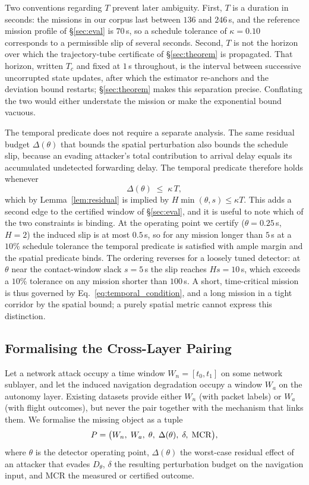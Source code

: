 Two conventions regarding $T$ prevent later ambiguity. First, $T$ is a duration
in seconds: the missions in our corpus last between $136$ and $246$\,s, and the
reference mission profile of \S\ref{sec:eval} is $70$\,s, so a schedule
tolerance of $\kappa=0.10$ corresponds to a permissible slip of several seconds.
Second, $T$ is not the horizon over which the trajectory-tube certificate
of \S\ref{sec:theorem} is propagated. That horizon, written $T_c$ and fixed at
$1$\,s throughout, is the interval between successive uncorrupted state updates,
after which the estimator re-anchors and the deviation bound restarts;
\S\ref{sec:theorem} makes this separation precise. Conflating the two would
either understate the mission or make the exponential bound vacuous.

The temporal predicate does not require a separate analysis. The same residual
budget $\Delta(\theta)$ that bounds the spatial perturbation also bounds the
schedule slip, because an evading attacker's total contribution to arrival delay
equals its accumulated undetected forwarding delay. The temporal predicate
therefore holds whenever
\begin{equation}
\label{eq:temporal_condition}
\Delta(\theta)\;\le\;\kappa\,T ,
\end{equation}
which by Lemma~\ref{lem:residual} is implied by $H\min(\theta,s)\le\kappa T$.
This adds a second edge to the certified window of \S\ref{sec:eval}, and it is
useful to note which of the two constraints is binding. At the operating point
we certify ($\theta=0.25$\,s, $H=2$) the induced slip is at most $0.5$\,s, so
for any mission longer than $5$\,s at a $10\%$ schedule tolerance the temporal
predicate is satisfied with ample margin and the spatial predicate binds.
The ordering reverses for a loosely tuned detector: at $\theta$ near the
contact-window slack $s=5$\,s the slip reaches $H s = 10$\,s, which exceeds a
$10\%$ tolerance on any mission shorter than $100$\,s. A short, time-critical
mission is thus governed by Eq.~\eqref{eq:temporal_condition}, and a long
mission in a tight corridor by the spatial bound; a purely spatial metric cannot
express this distinction.

\subsection{Formalising the Cross-Layer Pairing}
\label{sec:formulation}
Let a network attack occupy a time window $W_n=[t_0,t_1]$ on some network
sublayer, and let the induced navigation degradation occupy a window $W_a$ on
the autonomy layer. Existing datasets provide either $W_n$ (with packet labels)
or $W_a$ (with flight outcomes), but never the pair together with the mechanism
that links them. We formalise the missing object as a tuple
\begin{equation}
\label{eq:pairing}
P = \big(W_n,\; W_a,\; \theta,\; \Delta(\theta),\; \delta,\; \mathrm{MCR}\big),
\end{equation}
where $\theta$ is the detector operating point, $\Delta(\theta)$ the worst-case
residual effect of an attacker that evades $D_\theta$, $\delta$ the resulting
perturbation budget on the navigation input, and MCR the measured or certified
outcome.


